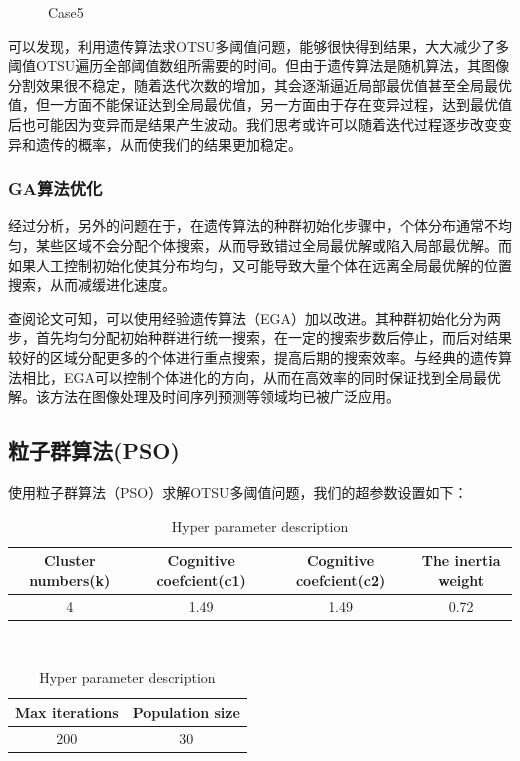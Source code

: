 \documentclass{article}
\begin{document}
\begin{figure}[h]
\begin{minipage}[t]{0.2\textwidth}
		\caption{Case5}
	\end{minipage}
\end{figure}

可以发现，利用遗传算法求OTSU多阈值问题，能够很快得到结果，大大减少了多阈值OTSU遍历全部阈值数组所需要的时间。但由于遗传算法是随机算法，其图像分割效果很不稳定，随着迭代次数的增加，其会逐渐逼近局部最优值甚至全局最优值，但一方面不能保证达到全局最优值，另一方面由于存在变异过程，达到最优值后也可能因为变异而是结果产生波动。我们思考或许可以随着迭代过程逐步改变变异和遗传的概率，从而使我们的结果更加稳定。
\subsubsection*{GA算法优化}
经过分析，另外的问题在于，在遗传算法的种群初始化步骤中，个体分布通常不均匀，某些区域不会分配个体搜索，从而导致错过全局最优解或陷入局部最优解。而如果人工控制初始化使其分布均匀，又可能导致大量个体在远离全局最优解的位置搜索，从而减缓进化速度。

查阅论文可知，可以使用经验遗传算法（EGA）加以改进。其种群初始化分为两步，首先均匀分配初始种群进行统一搜索，在一定的搜索步数后停止，而后对结果较好的区域分配更多的个体进行重点搜索，提高后期的搜索效率。与经典的遗传算法相比，EGA可以控制个体进化的方向，从而在高效率的同时保证找到全局最优解。该方法在图像处理及时间序列预测等领域均已被广泛应用。

\subsection{粒子群算法(PSO)}
使用粒子群算法（PSO）求解OTSU多阈值问题，我们的超参数设置如下：
\begin{table}[h]
	\centering
	\begin{tabular}{cccc}
	  \hline
	  Cluster numbers(k) & Cognitive coefcient(c1) & Cognitive coefcient(c2) & The inertia weight\\ \hline
	  4
	  & 1.49
	  & 1.49
	  & 0.72
	  \\ \hline
	\end{tabular}
	\\
	\begin{tabular}{cc}
		\hline
		Max iterations & Population size\\ \hline
		200
		&30
		\\ \hline
	\end{tabular}
	\caption{Hyper parameter description}
\end{table}
\end{document}
